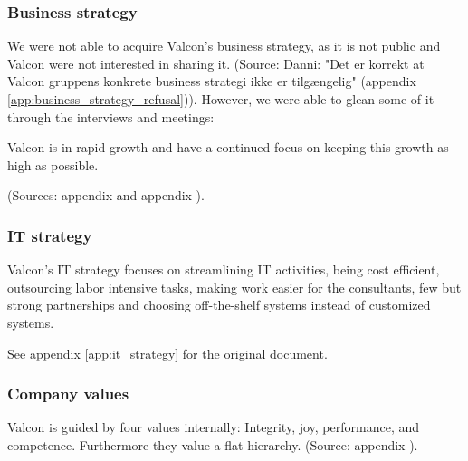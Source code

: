 \subsubsection{Business strategy}
We were not able to acquire Valcon's business strategy, as it is not public and Valcon were not interested in sharing it. (Source: Danni: "Det er korrekt at Valcon gruppens konkrete business strategi ikke er tilgængelig" (appendix \ref{app:business_strategy_refusal})). 
However, we were able to glean some of it through the interviews and meetings:

Valcon is in rapid growth and have a continued focus on keeping this growth as high as possible. 

(Sources: appendix  and appendix ).

\subsubsection{IT strategy}
Valcon's IT strategy focuses on streamlining IT activities, being cost efficient, outsourcing labor intensive tasks, making work easier for the consultants, few but strong partnerships and choosing off-the-shelf systems instead of customized systems.

See appendix \ref{app:it_strategy} for the original document.

\subsubsection{Company values}
Valcon is guided by four values internally: Integrity, joy, performance, and competence.
Furthermore they value a flat hierarchy.
(Source: appendix ).